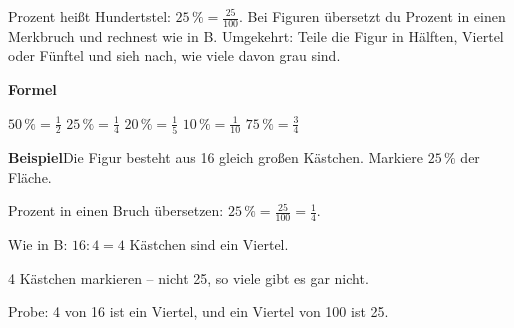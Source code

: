 \documentclass[11pt]{article}
\begin{document}
\clearpage\label{s:E}\noindent\colorbox{black!12}{}\hspace{3mm}{\Large\bfseries Anteil in Prozent}\par\smallskip
\noindent Prozent heißt Hundertstel: $25\,\% = \frac{25}{100}$. Bei Figuren übersetzt du Prozent in einen Merkbruch und rechnest wie in B. Umgekehrt: Teile die Figur in Hälften, Viertel oder Fünftel und sieh nach, wie viele davon grau sind.\par\medskip
\noindent\textbf{Formel}\par\nopagebreak\noindent\hspace*{4mm}\begin{minipage}{\dimexpr\linewidth-4mm\relax}$50\,\% = \frac{1}{2}$ \quad $25\,\% = \frac{1}{4}$ \quad $20\,\% = \frac{1}{5}$ \quad $10\,\% = \frac{1}{10}$ \quad $75\,\% = \frac{3}{4}$ \end{minipage}\par\medskip
\noindent\textbf{Beispiel}\quad Die Figur besteht aus 16 gleich großen Kästchen. Markiere $25\,\%$ der Fläche.\par\smallskip
\noindent\begin{minipage}[t]{0.6\linewidth}\vspace{0pt}\par\noindent{}Prozent in einen Bruch übersetzen: $25\,\% = \frac{25}{100} = \frac{1}{4}$.\par\smallskip\par\noindent{}Wie in B: $16 : 4 = 4$ Kästchen sind ein Viertel.\par\smallskip\par\noindent{}4 Kästchen markieren – nicht 25, so viele gibt es gar nicht.\par\smallskip\par\noindent{}Probe: 4 von 16 ist ein Viertel, und ein Viertel von 100 ist 25.\par\smallskip\end{minipage}\hfill
\begin{minipage}[t]{0.37\linewidth}\vspace{0pt}\centering {}\end{minipage}\par\medskip
\end{document}
